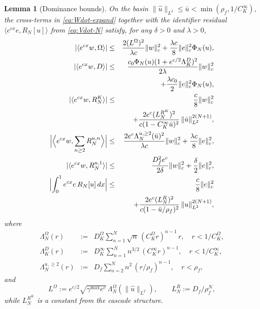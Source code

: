 \documentclass[journal,twoside,web]{ieeecolor}
\newtheorem{lemma}{Lemma}
\begin{document}
\begin{lemma}[Dominance bounds]\label{lem:dominance}
On the basin $\|\hat u\|_{L^2}\le\bar u<\min(\rho_f,1/C_K^\infty)$, the cross-terms in \eqref{eq:Wdot-expand} together with the identifier residual $\langle e^{cx}e,R_N[u]\rangle$ from \eqref{eq:Vdot-N} satisfy, for any $\delta>0$ and $\lambda>0$,
\begin{eqnarray}
|\langle e^{cx}w,\Omega\rangle| &\le& \frac{2(L^\Omega)^2}{\lambda c}\|w\|_c^2+\frac{\lambda c}{8}\|e\|_c^2\Phi_N(u), \label{eq:Omega-Y}\\
|\langle e^{cx}w,D\rangle| &\le& \frac{c_0\Phi_N(u)(1+e^{c/2}\Lambda^D_K)^2}{2\lambda}\|w\|_c^2 \nonumber\\
&& +\frac{\lambda c_0}{2}\|e\|_c^2\Phi_N(u), \label{eq:D-Y-corrected}\\
|\langle e^{cx}w,R^K_N\rangle| &\le& \frac{c}{8}\|w\|_c^2 \nonumber\\
&& +\frac{2e^c(L^{R^K}_N)^2}{c(1-C_K^\infty\bar u)^2}\,\|\hat u\|_{L^2}^{2(N+1)}, \label{eq:RK-Y}\\
\Bigl|\Bigl\langle e^{cx}w,\sum_{n\ge 2}R^{u,n}_N\Bigr\rangle\Bigr| &\le& \frac{2e^c\Lambda^{u,\ge 2}_N(\bar u)^2}{\lambda c}\|w\|_c^2+\frac{\lambda c}{8}\|e\|_c^2, \label{eq:Ru-ge2-Y}\\
|\langle e^{cx}w,R^{u,1}_N\rangle| &\le& \frac{D_f^2 e^c}{2\delta}\|w\|_c^2+\frac{\delta}{2}\|e\|_c^2, \label{eq:Ru-1-Y}\\
\Bigl|\int_0^1 e^{cx}e\,R_N[u]\,dx\Bigr| &\le& \frac{c}{8}\|e\|_c^2 \nonumber\\
&& +\frac{2e^c(L^R_N)^2}{c(1-\bar u/\rho_f)^2}\,\|u\|_{L^2}^{2(N+1)}, \label{eq:RN-Y}
\end{eqnarray}
where
\begin{eqnarray}
\Lambda^\Omega_N(r) &:=& D_K^\Omega\sum_{n=1}^N\sqrt{n}\,(C_K^\Omega r)^{n-1}\,r,\quad r<1/C_K^\Omega, \label{eq:LambdaOmega}\\
\Lambda^D_K(r) &:=& D_K^\infty\sum_{n=1}^N n^{3/2}\,(C_K^\infty r)^{n-1},\quad r<1/C_K^\infty, \label{eq:LambdaDK-def}\\
\Lambda^{u,\ge 2}_N(r) &:=& D_f\sum_{n=2}^N n^2\,(r/\rho_f)^{n-1},\quad r<\rho_f, \label{eq:Lambda-uge2}
\end{eqnarray}
and
\begin{equation}\label{eq:LOmega-LR-def}
L^\Omega:=e^{c/2}\sqrt{\gamma^{\max}e^c}\,\Lambda^\Omega_N(\|\hat u\|_{L^2}),\qquad L^R_N:=D_f/\rho_f^N,
\end{equation}
while $L^{R^K}_N$ is a constant from the cascade structure.
\end{lemma}
\end{document}
